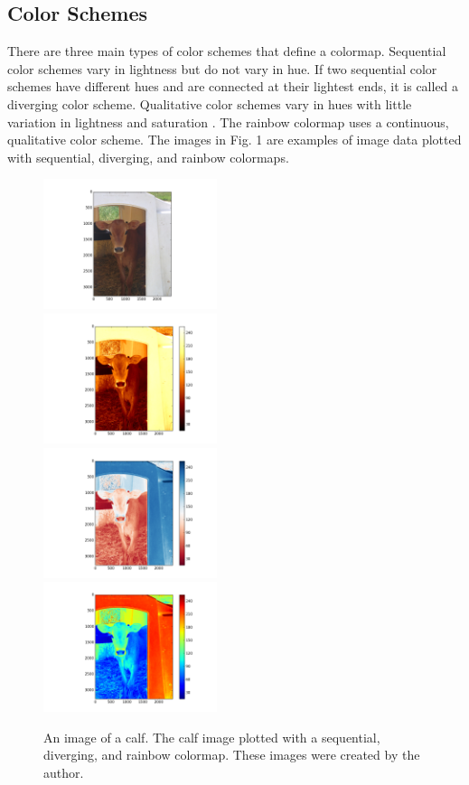 \documentclass[journal,12pt]{IEEEtran}
\begin{document}
\subsection{Color Schemes}

There are three main types of color schemes that define a colormap.
Sequential color schemes vary in lightness but do not
vary in hue. If two sequential color schemes have different hues and are
connected at their lightest ends, it is called a diverging color scheme. Qualitative color
schemes vary in hues with little variation in lightness
and saturation \cite{colormapping}. The rainbow colormap uses a continuous,
qualitative color scheme. The images in Fig. 1
are examples of image data plotted with 
sequential, diverging, and rainbow colormaps.

\begin{figure}
\centering
\includegraphics[width=2in]{calf_original} \\
\includegraphics[width=2in]{calf_sequential} \\
\includegraphics[width=2in]{calf_diverging} \\
\includegraphics[width=2in]{calf_rainbow} \\
\caption{An image of a calf. The calf image plotted with a
sequential, diverging, and rainbow colormap. These images were created by the author.}
\end{figure}
\end{document}

